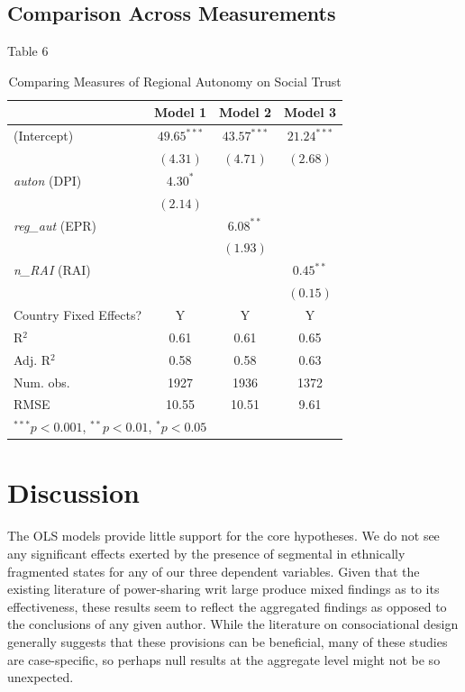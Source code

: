 \documentclass[12pt]{article}
\begin{document}
\subsection{Comparison Across Measurements}

Table 6

\begin{table}[!htbp]
	\begin{center}
		\begin{tabular}{l c c c }
			\hline
			& Model 1 & Model 2 & Model 3 \\
			\hline
			(Intercept)        & $49.65^{***}$ & $43.57^{***}$ & $21.24^{***}$ \\
			& $(4.31)$      & $(4.71)$      & $(2.68)$      \\
			\textit{auton} (DPI)         & $4.30^{*}$    &               &               \\
			& $(2.14)$      &               &               \\
			\textit{reg\_aut} (EPR) &               & $6.08^{**}$   &               \\
			&               & $(1.93)$      &               \\
			\textit{n\_RAI} (RAI)        &               &               & $0.45^{**}$   \\
			&               &               & $(0.15)$      \\
			\hline
			Country Fixed Effects?	& Y				& Y				& Y				\\
			R$^2$              		& 0.61          & 0.61          & 0.65          \\
			Adj. R$^2$         		& 0.58          & 0.58          & 0.63          \\
			Num. obs.          		& 1927          & 1936          & 1372          \\
			RMSE               		& 10.55         & 10.51         & 9.61          \\
			\hline
			\multicolumn{4}{l}{\scriptsize{$^{***}p<0.001$, $^{**}p<0.01$, $^*p<0.05$}}
		\end{tabular}
		\caption{Comparing Measures of Regional Autonomy on Social Trust}
		\label{table:coefficients}
	\end{center}
\end{table}

\section{Discussion}
The OLS models provide little support for the core hypotheses. We do not see any significant effects exerted by the presence of segmental in ethnically fragmented states for any of our three dependent variables. Given that the existing literature of power-sharing writ large produce mixed findings as to its effectiveness, these results seem to reflect the aggregated findings as opposed to the conclusions of any given author. While the literature on consociational design generally suggests that these provisions can be beneficial, many of these studies are case-specific, so perhaps null results at the aggregate level might not be so unexpected. 
\end{document}
